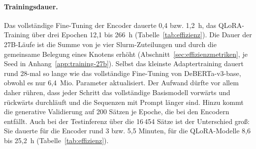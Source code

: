 \begin{table}[htbp]
  \centering
  \scriptsize
  \caption[Ressourcenbedarf der Konfigurationen]{Ressourcenbedarf der
  Konfigurationen nach dem Protokoll aus
  Abschnitt~\ref{sec:effizienzmetriken}: Trainingsdauer laut
  Slurm-Abrechnung (Mittel über drei Seeds), Gesamtdauer der Testinferenz
  über 16\,454 Sätze, Latenz des Modellaufrufs je Testsatz bei
  Batchgröße~1 (Mittelwert, Median, 95.~Perzentil), Durchsatz in
  Testsätzen je Sekunde reiner Generierungszeit und maximal allokierter
  GPU-Speicher während der Testinferenz.
  GPU: H100 = H100 80\,GB HBM3, A100 = A100-SXM4 80\,GB, NVL = H100 NVL
  94\,GB (Speichergrößen laut Herstellerangabe).}
  \label{tab:effizienz}
  \setlength{\tabcolsep}{3pt}
  
\end{table}

\paragraph{Trainingsdauer.}
Das vollständige Fine-Tuning der Encoder dauerte 0,4 bzw. 1,2~h, das
QLoRA-Training über drei Epochen 12,1 bis 266~h
(Tabelle~\ref{tab:effizienz}).
Die Dauer der 27B-Läufe ist die Summe von je vier Slurm-Zuteilungen
und durch die gemeinsame Belegung eines Knotens erhöht
(Abschnitt~\ref{sec:effizienzmetriken}, je Seed in
Anhang~\ref{app:training-27b}).
Selbst das kleinste Adaptertraining dauert rund 28-mal so lange wie das
vollständige Fine-Tuning von DeBERTa-v3-base, obwohl es nur 6,4~Mio.
Parameter aktualisiert. Der Aufwand dürfte vor allem daher rühren, dass
jeder Schritt das vollständige Basismodell vorwärts und rückwärts
durchläuft und die Sequenzen mit Prompt länger sind.
Hinzu kommt die generative Validierung auf 200 Sätzen je Epoche, die bei
den Encodern entfällt.
Auch bei der Testinferenz über die 16\,454 Sätze ist der Unterschied
groß: Sie dauerte
für die Encoder rund 3 bzw. 5,5 Minuten, für die QLoRA-Modelle 8,6 bis
25,2~h (Tabelle~\ref{tab:effizienz}).


